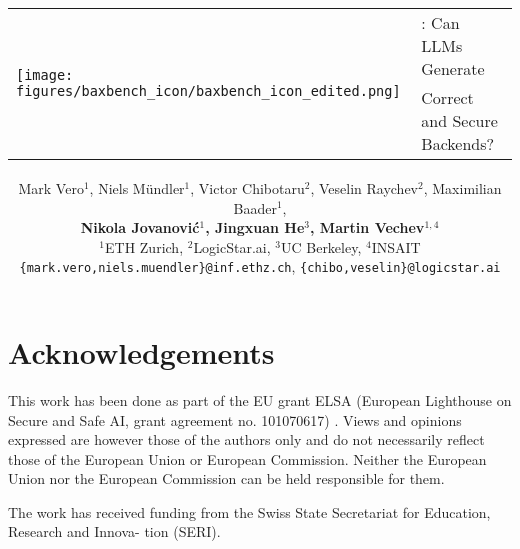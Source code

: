 \documentclass[nohyperref]{article}
\title{
\begin{tabular}[t]{ll}
  \multirow{2}{*}{\texttt{[image: figures/baxbench\_icon/baxbench\_icon\_edited.png]}}&\benchmark{}: Can LLMs Generate\\
  &Correct and Secure Backends?
\end{tabular}%
}
\author{Mark Vero$^1$, Niels Mündler$^1$, Victor Chibotaru$^2$, Veselin Raychev$^2$, Maximilian Baader$^1$, \\\textbf{Nikola Jovanovi\'c$^1$, Jingxuan He$^3$, Martin Vechev$^{1,4}$}\\$^1$ETH Zurich, $^2$LogicStar.ai, $^3$UC Berkeley, $^4$INSAIT\\\texttt{\{mark.vero,niels.muendler\}@inf.ethz.ch}, \texttt{\{chibo,veselin\}@logicstar.ai}}
\begin{document}
\maketitle

\begin{abstract}
	
\end{abstract}









\clearpage
\section*{Acknowledgements}
This work has been done as part of the EU grant ELSA (European Lighthouse on Secure and Safe AI,
grant agreement no. 101070617) . Views and opinions expressed are however those of the authors
only and do not necessarily reflect those of the European Union or European Commission. Neither
the European Union nor the European Commission can be held responsible for them.

The work has received funding from the Swiss State Secretariat for Education, Research and Innova-
tion (SERI).











\newpage
\appendix

\end{document}

